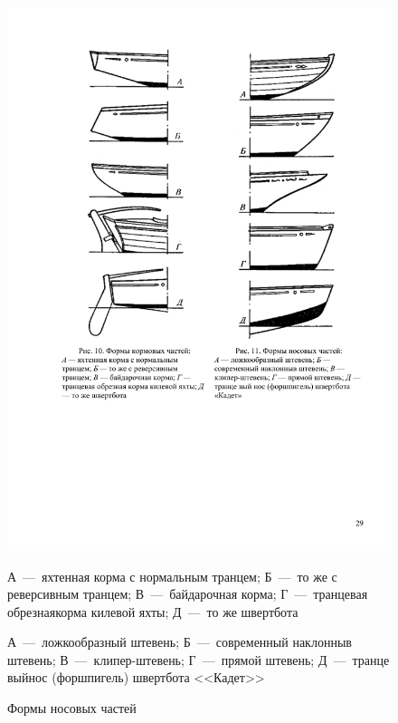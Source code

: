 \documentclass[a4paper, 12pt, twoside, final]{scrbook}
\begin{document}
\begin{figure}[htbp]
\begin{minipage}[b]{0.49\textwidth}
		\centering\includegraphics{Formy_nos}
		\caption{Формы носовых частей}
		\label{fig:11}
	\end{minipage}
	\par
	\smallskip
	\begin{minipage}[b]{0.49\textwidth}
		\centering\small
		А~---~яхтенная корма с нормальным транцем;
		Б~---~то же с реверсивным транцем;
		В~---~байдарочная корма;
		Г~---~транцевая обрезнаякорма килевой яхты;
		Д~---~то же швертбота
	\end{minipage}
	\hfil\hfil%
	\begin{minipage}[b]{0.49\textwidth}
		\centering\small
		А~---~ложкообразный штевень;
		Б~---~современный наклонныв штевень;
		В~---~клипер-штевень;
		Г~---~прямой штевень;
		Д~---~транце выйнос (форшпигель) швертбота <<Кадет>>
	\end{minipage}
\end{figure}
\end{document}
